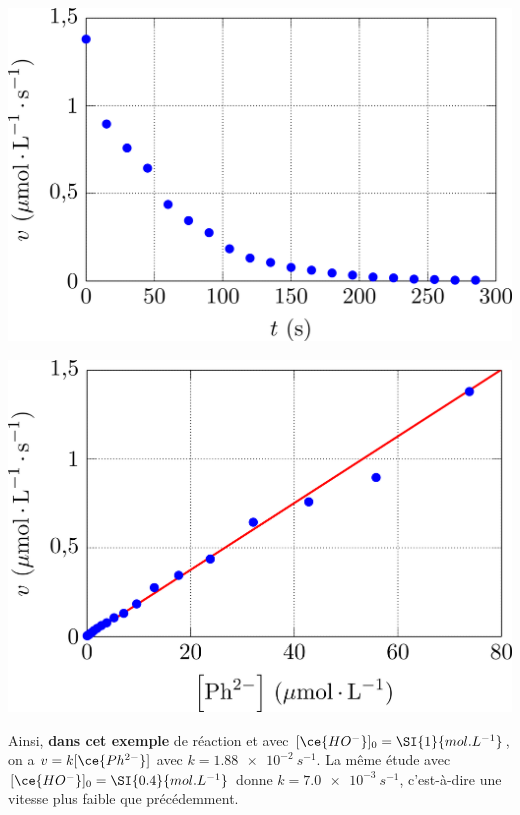 \documentclass[../../main/main.tex]{subfiles}
\begin{document}
\begin{minipage}{0.49\linewidth}
	\begin{center}
		\includegraphics[width=\linewidth]{ph_evol-d}
	\end{center}
\end{minipage}
\begin{minipage}{0.49\linewidth}
	\begin{center}
		\includegraphics[width=\linewidth]{ph_evol-e}
	\end{center}
\end{minipage}

Ainsi, \textbf{dans cet exemple} de réaction et avec $[\ce{HO^{-}}]_0 =
	\SI{1}{mol.L^{-1}}$, on a $v = k[\ce{Ph^{2-}}]$ avec $k =
	\SI{1.88e-2}{s^{-1}}$. La même étude avec $[\ce{HO^{-}}]_0 =
	\SI{0.4}{mol.L^{-1}}$ donne $k = \SI{7.0e-3}{s^{-1}}$, c'est-à-dire une vitesse
plus faible que précédemment.
\end{document}
